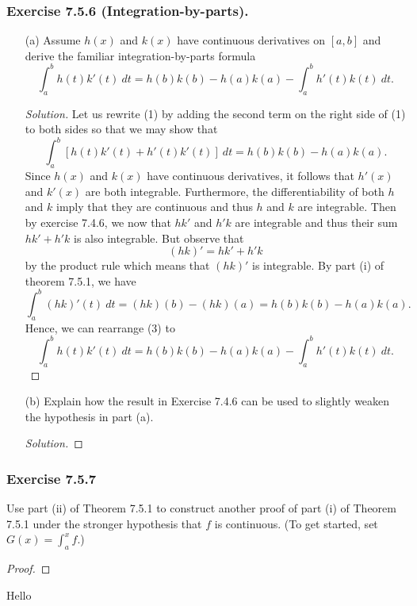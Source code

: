 \subsubsection{Exercise 7.5.6 (Integration-by-parts).} 
\begin{enumerate}
	\item[(a)] Assume \( h(x)  \) and \( k(x)  \) have continuous derivatives on \( [a,b]  \) and derive the familiar integration-by-parts formula 
		\[  \int_{ a }^{ b } h(t)k'(t) \   dt = h(b)k(b) - h(a)k(a) - \int_{ a }^{ b } h'(t)k(t) \    dt. \tag{1} \]
		\begin{proof}[Solution]
		Let us rewrite (1) by adding the second term on the right side of (1) to both sides so that we may show that 
		\[  \int_{ a }^{ b } [h(t)k'(t) + h'(t)k'(t)] \    dt = h(b)k(b) - h(a)k(a) \tag{2}. \]
	Since \( h(x)  \) and \( k(x)  \) have continuous derivatives, it follows that \( h'(x)  \) and \( k'(x)  \) are both integrable. Furthermore, the differentiability of both \( h  \) and \( k  \) imply that they are continuous and thus \( h \) and \( k  \) are integrable. Then by exercise 7.4.6, we now that \( h k'  \) and \( h'k  \) are integrable and thus their sum \( hk' + h'k  \) is also integrable. But observe that 
	\[  (hk)' = hk' + h'k  \]
	by the product rule which means that \( (hk)' \) is integrable. By part (i) of theorem 7.5.1, we have 
	\[  \int_{ a }^{ b } (hk)'(t) \ dt = (hk)(b) - (hk)(a) = h(b)k(b) - h(a)k(a) \tag{3}. \]
	Hence, we can rearrange (3) to 
	\[  \int_{ a }^{ b } h(t)k'(t) \   dt = h(b)k(b) - h(a)k(a) - \int_{ a }^{ b } h'(t)k(t) \    dt. \]
		\end{proof}
	\item[(b)] Explain how the result in Exercise 7.4.6 can be used to slightly weaken the hypothesis in part (a).
		\begin{proof}[Solution]
		
		\end{proof}
\end{enumerate}
 
\subsubsection{Exercise 7.5.7} Use part (ii) of Theorem 7.5.1 to construct another proof of part (i) of Theorem 7.5.1 under the stronger hypothesis that \( f  \) is continuous. (To get started, set \( G(x) = \int_{ a }^{ x }  f   \).)
\begin{proof}
\end{proof}



Hello
